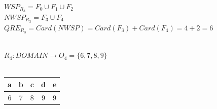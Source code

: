 		\noindent
		$WSP_{R_{3}} = F_{0} \cup F_{1} \cup  F_{2}$ \\
		$NWSP_{R_{3}} = F_{3} \cup F_{4}$\\
		$QRE_{R_{3}} = Card(NWSP) = Card(F_{3}) +  Card(F_{4})= 4+2= 6 $
		\\\\
		
		\newpage
		
		\noindent
		$R_{4}: DOMAIN \rightarrow O_{4}=\{6,7,8,9\}$\\\\
		\begin{table}[h!]
			\begin{center}
				\begin{tabular}{|c|c|c|c|c|}
					\hline
					a & b & c & d & e \\
					\hline
					6 & 7 & 8 & 9 & 9 \\
					\hline
				\end{tabular}
			\end{center}
		\end{table}
		
